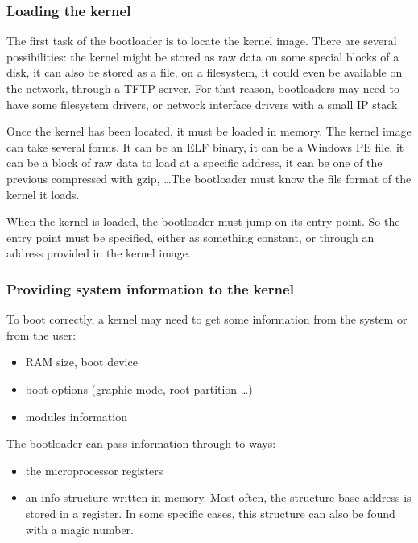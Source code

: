 \begin{frame}
  \frametitle{Loading the kernel}

  The first task of the bootloader is to locate the kernel image. There are several possibilities: the kernel might be stored as raw data on some special blocks of a disk, it can also be stored as a file, on a filesystem, it could even be available on the network, through a TFTP server. For that reason, bootloaders may need to have some filesystem drivers, or network interface drivers with a small IP stack.

  \-

  Once the kernel has been located, it must be loaded in memory. The kernel image can take several forms. It can be an ELF binary, it can be a Windows PE file, it can be a block of raw data to load at a specific address, it can be one of the previous compressed with gzip, \ldots The bootloader must know the file format of the kernel it loads.

  \-
  
  When the kernel is loaded, the bootloader must jump on its entry point. So the entry point must be specified, either as something constant, or through an address provided in the kernel image.

\end{frame}

\begin{frame}
  \frametitle{Providing system information to the kernel}

  To boot correctly, a kernel may need to get some information from the system or from the user:

  \begin{itemize}
  \item RAM size, boot device
  \item boot options (graphic mode, root partition \ldots)
  \item modules information
  \end{itemize}

  \-

  The bootloader can pass information through to ways:

  \begin{itemize}
  \item the microprocessor registers
  \item an info structure written in memory. Most often, the structure base address is stored in a register. In some specific cases, this structure can also be found with a magic number.
  \end{itemize}

\end{frame}

